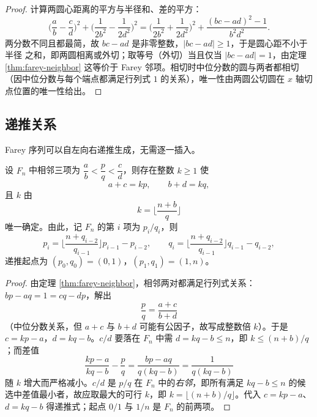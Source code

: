 \begin{proof}
计算两圆心距离的平方与半径和、差的平方：
\[
  \Big(\frac ab-\frac cd\Big)^2+\Big(\frac{1}{2b^2}-\frac{1}{2d^2}\Big)^2
  =\Big(\frac{1}{2b^2}+\frac{1}{2d^2}\Big)^2+\frac{(bc-ad)^2-1}{b^2d^2}.
\]
两分数不同且都最简，故 $bc-ad$ 是非零整数，$|bc-ad|\ge1$，于是圆心距不小于半径
之和，即两圆相离或外切；取等号（外切）当且仅当 $|bc-ad|=1$，由定理
\ref{thm:farey-neighbor} 这等价于 Farey 邻项。相切时中位分数的圆与两者都相切
（因中位分数与每个端点都满足行列式 $1$ 的关系），唯一性由两圆公切圆在
$x$ 轴切点位置的唯一性给出。
\end{proof}

\subsection{递推关系}

Farey 序列可以自左向右递推生成，无需逐一插入。

\begin{proposition}\label{prop:farey-recurrence}
设 $F_n$ 中相邻三项为 $\dfrac ab<\dfrac pq<\dfrac cd$，则存在整数 $k\ge1$ 使
\[
  a+c=kp,\qquad b+d=kq,
\]
且 $k$ 由
\[
  k=\Big\lfloor\frac{n+b}{q}\Big\rfloor
\]
唯一确定。由此，记 $F_n$ 的第 $i$ 项为 $p_i/q_i$，则
\[
  p_{i}=\Big\lfloor\frac{n+q_{i-2}}{q_{i-1}}\Big\rfloor p_{i-1}-p_{i-2},
  \qquad
  q_{i}=\Big\lfloor\frac{n+q_{i-2}}{q_{i-1}}\Big\rfloor q_{i-1}-q_{i-2},
\]
递推起点为 $(p_0,q_0)=(0,1)$，$(p_1,q_1)=(1,n)$。
\end{proposition}

\begin{proof}
由定理 \ref{thm:farey-neighbor}，相邻两对都满足行列式关系：
$bp-aq=1=cq-dp$，解出
\[
  \frac pq=\frac{a+c}{b+d}
\]
（中位分数关系，但 $a+c$ 与 $b+d$ 可能有公因子，故写成整数倍 $k$）。于是
$c=kp-a$，$d=kq-b$。$c/d$ 要落在 $F_n$ 中需 $d=kq-b\le n$，即
$k\le(n+b)/q$；而差值
\[
  \frac{kp-a}{kq-b}-\frac pq=\frac{bp-aq}{q(kq-b)}=\frac{1}{q(kq-b)}
\]
随 $k$ 增大而严格减小。$c/d$ 是 $p/q$ 在 $F_n$ 中的\emph{右邻}，即所有满足
$kq-b\le n$ 的候选中差值最小者，故应取最大的可行 $k$，即
$k=\lfloor(n+b)/q\rfloor$。代入 $c=kp-a$、$d=kq-b$ 得递推式；起点 $0/1$ 与
$1/n$ 是 $F_n$ 的前两项。
\end{proof}
